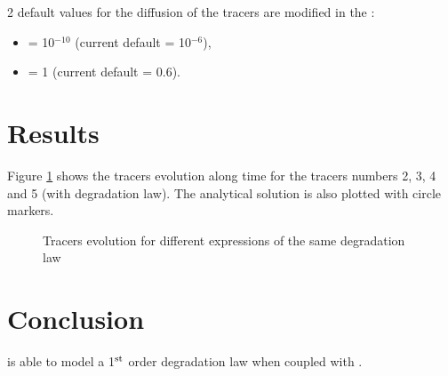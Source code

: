 2 default values for the diffusion of the tracers are modified
in the   :
\begin{itemize}
\item {} = 10$^{-10}$ (current default = 10$^{-6}$),
\item {} = 1 (current default = 0.6).
\end{itemize}

\section{Results}

Figure \ref{fig:tracer_decrease:res} shows the tracers evolution along time for the tracers numbers 2, 3, 4 and 5
(with degradation law).
The analytical solution is also plotted with circle markers.

\begin{figure} [H]
\centering
{}
 \caption{Tracers evolution for different expressions of the same degradation law}
 \label{fig:tracer_decrease:res}
\end{figure}

\section{Conclusion}

\waqtel is able to model a 1$^{\rm{st}}$ order degradation law when coupled with
.
